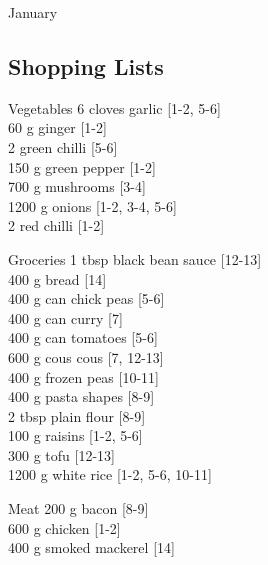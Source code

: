 \begin{menu}{January}
    \subsection*{Shopping Lists}
      \begin{shoppinglist}{Vegetables}
      6 cloves garlic {\scriptsize[1-2, 5-6]}\\
      60 g ginger {\scriptsize[1-2]}\\
      2  green chilli {\scriptsize[5-6]}\\
      150 g green pepper {\scriptsize[1-2]}\\
      700 g mushrooms {\scriptsize[3-4]}\\
      1200 g onions {\scriptsize[1-2, 3-4, 5-6]}\\
      2  red chilli {\scriptsize[1-2]}\\
      \end{shoppinglist}%
      \begin{shoppinglist}{Groceries}
      1 tbsp black bean sauce {\scriptsize[12-13]}\\
      400 g bread {\scriptsize[14]}\\
      400 g can chick peas {\scriptsize[5-6]}\\
      400 g can curry {\scriptsize[7]}\\
      400 g can tomatoes {\scriptsize[5-6]}\\
      600 g cous cous {\scriptsize[7, 12-13]}\\
      400 g frozen peas {\scriptsize[10-11]}\\
      400 g pasta shapes {\scriptsize[8-9]}\\
      2 tbsp plain flour {\scriptsize[8-9]}\\
      100 g raisins {\scriptsize[1-2, 5-6]}\\
      300 g tofu {\scriptsize[12-13]}\\
      1200 g white rice {\scriptsize[1-2, 5-6, 10-11]}\\
      \end{shoppinglist}%
      \par\vfil %
      \begin{shoppinglist}{Meat}
      200 g bacon {\scriptsize[8-9]}\\
      600 g chicken {\scriptsize[1-2]}\\
      400 g smoked mackerel {\scriptsize[14]}\\
      \end{shoppinglist}%

\end{menu}
